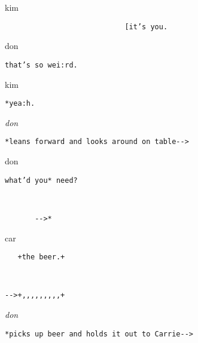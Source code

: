 \documentclass[output=paper,nonflat,modfont,draft]{langsci/langscibook}
\begin{document}
\begin{transbox}{10}{kim}
\begin{verbatim}
                            [it’s you.
\end{verbatim}
\end{transbox}

\begin{transbox}{11}{don}
\begin{verbatim}
that’s so wei:rd.
\end{verbatim}
\end{transbox}

\begin{transbox}{12}{kim}
\begin{verbatim}
*yea:h.
\end{verbatim}
\end{transbox}

\begin{transbox}{13}{\textit{don}}
\begin{verbatim}
*leans forward and looks around on table-->
\end{verbatim}
\end{transbox}


\begin{transbox}{15}{don}
\begin{verbatim}
what’d you* need?
\end{verbatim}
\end{transbox}

\begin{transbox}{16}{~}
\begin{verbatim}
       -->*
\end{verbatim}
\end{transbox}


\begin{transbox}{18}{car}
\begin{verbatim}
   +the beer.+
\end{verbatim}
\end{transbox}

\begin{transbox}{19}{~}
\begin{verbatim}
-->+,,,,,,,,,+
\end{verbatim}
\end{transbox}


\begin{mdframedkendrick}[style=secondfoc]
\begin{transbox}{21}{\textit{don}}
\begin{verbatim}
*picks up beer and holds it out to Carrie-->
\end{verbatim}
\end{transbox}
\end{mdframedkendrick}\vspace{-5mm}
\end{document}
